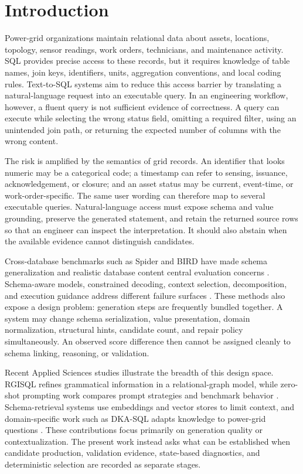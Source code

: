 \documentclass[applsci,article,submit,moreauthors]{Definitions/mdpi}
\begin{document}
\section{Introduction}

Power-grid organizations maintain relational data about assets, locations, topology, sensor readings, work orders, technicians, and maintenance activity. SQL provides precise access to these records, but it requires knowledge of table names, join keys, identifiers, units, aggregation conventions, and local coding rules. Text-to-SQL systems aim to reduce this access barrier by translating a natural-language request into an executable query. In an engineering workflow, however, a fluent query is not sufficient evidence of correctness. A query can execute while selecting the wrong status field, omitting a required filter, using an unintended join path, or returning the expected number of columns with the wrong content.

The risk is amplified by the semantics of grid records. An identifier that looks numeric may be a categorical code; a timestamp can refer to sensing, issuance, acknowledgement, or closure; and an asset status may be current, event-time, or work-order-specific. The same user wording can therefore map to several executable queries. Natural-language access must expose schema and value grounding, preserve the generated statement, and retain the returned source rows so that an engineer can inspect the interpretation. It should also abstain when the available evidence cannot distinguish candidates.

Cross-database benchmarks such as Spider and BIRD have made schema generalization and realistic database content central evaluation concerns \cite{yu2018spider,li2023bird}. Schema-aware models, constrained decoding, context selection, decomposition, and execution guidance address different failure surfaces \cite{wang2020ratsql,scholak2021picard,nan2023enhancing,pourreza2023dinsql,talaei2024chess}. These methods also expose a design problem: generation steps are frequently bundled together. A system may change schema serialization, value presentation, domain normalization, structural hints, candidate count, and repair policy simultaneously. An observed score difference then cannot be assigned cleanly to schema linking, reasoning, or validation.

Recent Applied Sciences studies illustrate the breadth of this design space. RGISQL refines grammatical information in a relational-graph model, while zero-shot prompting work compares prompt strategies and benchmark behavior \cite{li2024rgisql,zhou2025zeroshot}. Schema-retrieval systems use embeddings and vector stores to limit context, and domain-specific work such as DKA-SQL adapts knowledge to power-grid questions \cite{bozdemir2026schema,bian2025dkasql}. These contributions focus primarily on generation quality or contextualization. The present work instead asks what can be established when candidate production, validation evidence, state-based diagnostics, and deterministic selection are recorded as separate stages.
\end{document}

